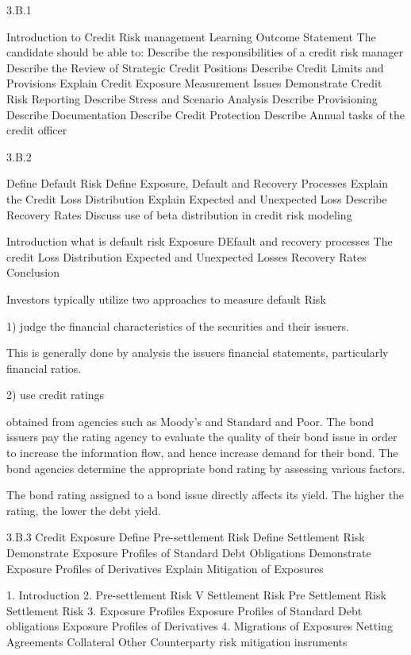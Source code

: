 3.B.1

Introduction to Credit Risk management
Learning Outcome Statement
The candidate should be able to:
 Describe the responsibilities of a credit risk manager
 Describe the Review of Strategic Credit Positions
 Describe Credit Limits and Provisions
 Explain Credit Exposure Measurement Issues
 Demonstrate Credit Risk Reporting
 Describe Stress and Scenario Analysis
 Describe Provisioning
 Describe Documentation
 Describe Credit Protection
 Describe Annual tasks of the credit officer

3.B.2

Define Default Risk
 Define Exposure, Default and Recovery Processes
 Explain the Credit Loss Distribution
 Explain Expected and Unexpected Loss
 Describe Recovery Rates
 Discuss use of beta distribution in credit risk modeling

Introduction
what is default risk
Exposure DEfault and recovery processes
The credit Loss Distribution
Expected and Unexpected Losses
Recovery Rates
Conclusion


Investors typically utilize two approaches to measure default Risk

1) judge the financial characteristics of the securities and their issuers.

This is generally done by analysis the issuers financial statements, particularly financial ratios.

2) use credit ratings

	obtained from agencies such as Moody's and Standard and Poor.
The bond issuers pay the rating agency to evaluate the quality of their bond issue in order to increase the information flow, and hence increase demand for their bond.
The bond agencies determine the appropriate bond rating by assessing various factors.

The bond rating assigned to a bond issue directly affects its yield. The higher the rating, the lower the debt yield.

3.B.3 Credit Exposure
 Define Pre-settlement Risk
 Define Settlement Risk
 Demonstrate Exposure Profiles of Standard Debt Obligations
 Demonstrate Exposure Profiles of Derivatives
 Explain Mitigation of Exposures

1. Introduction
2. Pre-settlement Risk V Settlement Risk
	Pre Settlement Risk
	Settlement Risk	
3. Exposure Profiles
	Exposure Profiles of Standard Debt obligations
	Exposure Profiles of Derivatives
4. Migrations of Exposures
 	Netting Agreements
	Collateral
	Other Counterparty risk mitigation insruments


